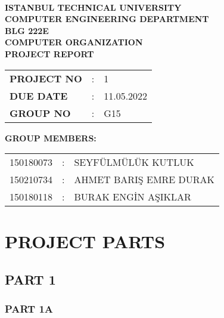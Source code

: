 \documentclass[pdftex,12pt,a4paper]{article}
\begin{document}
\begin{titlepage}
\begin{center}
\textbf{}\\
\textbf{\Large{ISTANBUL TECHNICAL UNIVERSITY}}\\
\vspace{0.5cm}
\textbf{\Large{COMPUTER ENGINEERING DEPARTMENT}}\\
\vspace{2cm}
\textbf{\Large{BLG 222E\\ COMPUTER ORGANIZATION\\ PROJECT REPORT}}\\
\vspace{2.8cm}
\begin{table}[ht]
\centering
\Large{
\begin{tabular}{lcl}
\textbf{PROJECT NO}  & : & 1 \\
\textbf{DUE DATE}  & : & 11.05.2022 \\
\textbf{GROUP NO}  & : & G15 \\
\end{tabular}}
\end{table}
\vspace{1cm}
\textbf{\Large{GROUP MEMBERS:}}\\
\begin{table}[ht]
\centering
\Large{
\begin{tabular}{rcl}
150180073  & : & SEYFÜLMÜLÜK KUTLUK \\
150210734  & : & AHMET BARIŞ EMRE DURAK \\
150180118  & : & BURAK ENGİN AŞIKLAR \\
\end{tabular}}
\end{table}
\vspace{2.8cm}

\end{center}

\end{titlepage}



\setcounter{page}{1}
\section{PROJECT PARTS}

\subsection{PART 1}

\subsubsection{PART 1A}
\end{document}
